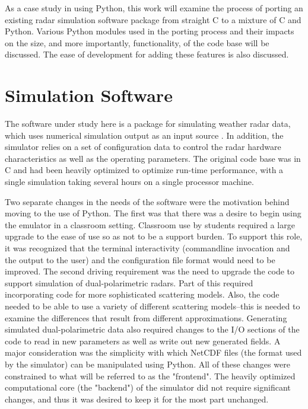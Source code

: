 \documentclass[twocolumn]{article}
\begin{document}
As a case study in using Python, this work will examine the process of porting
an existing radar simulation software package from straight C to a mixture of C
and Python. Various Python modules used in the porting process and their impacts
on the size, and more importantly, functionality, of the code base will be
discussed. The ease of development for adding these features is also discussed.

\section{Simulation Software}
The software under study here is a package for simulating weather radar data,
which uses numerical simulation output as an input source \cite{radarsim}. In
addition, the simulator relies on a set of configuration data to control the
radar hardware characteristics as well as the operating parameters. The original
code base was in C and had been heavily optimized to optimize run-time
performance, with a single simulation taking several hours on a single processor
machine.

Two separate changes in the needs of the software were the motivation behind
moving to the use of Python. The first was that there was a desire to
begin using the emulator in a classroom setting. Classroom use by students
required a large upgrade to the ease of use so as not to be a support burden. To
support this role, it was recognized that the terminal interactivity
(commandline invocation and the output to the user) and the configuration file
format would need to be improved. The second driving requirement was the need to
upgrade the code to support simulation of dual-polarimetric radars. Part of this
required incorporating code for more sophisticated scattering models. Also, the
code needed to be able to use a variety of different scattering models--this is
needed to examine the differences that result from different approximations.
Generating simulated dual-polarimetric data also required changes to the I/O
sections of the code to read in new parameters as well as write out new
generated fields. A major consideration was the simplicity with which NetCDF
files (the format used by the simulator) can be manipulated using Python. All of
these changes were constrained to what will be referred to as the "frontend".
The heavily optimized computational core (the "backend") of the simulator did
not require significant changes, and thus it was desired to keep it for the most
part unchanged.
\end{document}
